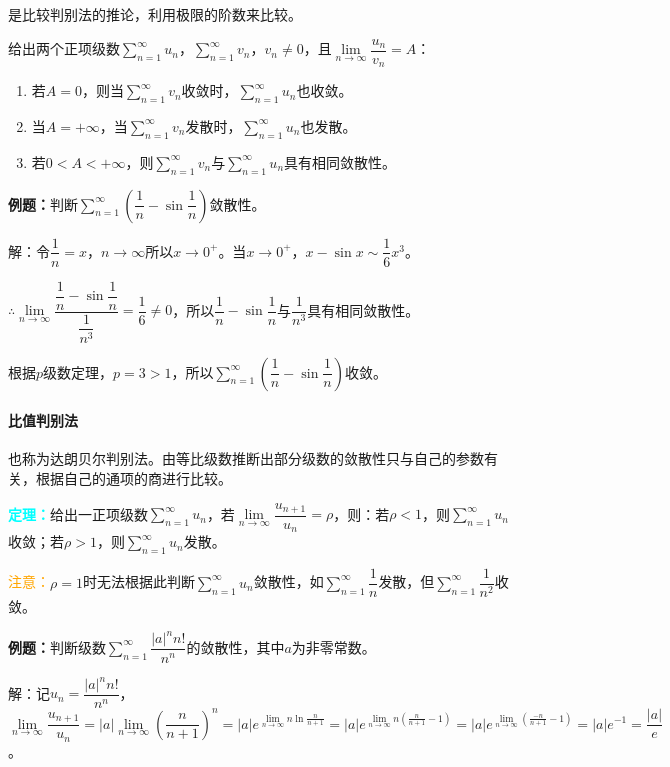\documentclass[UTF8, 12pt]{ctexart}
\begin{document}
是比较判别法的推论，利用极限的阶数来比较。

给出两个正项级数$\sum\limits_{n=1}^\infty u_n$，$\sum\limits_{n=1}^\infty v_n$，$v_n\neq0$，且$\lim\limits_{n\to\infty}\dfrac{u_n}{v_n}=A$：

\begin{enumerate}
    \item 若$A=0$，则当$\sum\limits_{n=1}^\infty v_n$收敛时，$\sum\limits_{n=1}^\infty u_n$也收敛。
    \item 当$A=+\infty$，当$\sum\limits_{n=1}^\infty v_n$发散时，$\sum\limits_{n=1}^\infty u_n$也发散。
    \item 若$0<A<+\infty$，则$\sum\limits_{n=1}^\infty v_n$与$\sum\limits_{n=1}^\infty u_n$具有相同敛散性。
\end{enumerate}

\textbf{例题：}判断$\sum\limits_{n=1}^\infty\left(\dfrac{1}{n}-\sin\dfrac{1}{n}\right)$敛散性。

解：令$\dfrac{1}{n}=x$，$n\to\infty$所以$x\to0^+$。当$x\to0^+$，$x-\sin x\sim\dfrac{1}{6}x^3$。

$\therefore\lim\limits_{n\to\infty}\dfrac{\dfrac{1}{n}-\sin\dfrac{1}{n}}{\dfrac{1}{n^3}}=\dfrac{1}{6}\neq0$，所以$\dfrac{1}{n}-\sin\dfrac{1}{n}$与$\dfrac{1}{n^3}$具有相同敛散性。

根据$p$级数定理，$p=3>1$，所以$\sum\limits_{n=1}^\infty\left(\dfrac{1}{n}-\sin\dfrac{1}{n}\right)$收敛。

\paragraph{比值判别法} \leavevmode \medskip

也称为达朗贝尔判别法。由等比级数推断出部分级数的敛散性只与自己的参数有关，根据自己的通项的商进行比较。

\textcolor{aqua}{\textbf{定理：}}给出一正项级数$\sum\limits_{n=1}^\infty u_n$，若$\lim\limits_{n\to\infty}\dfrac{u_{n+1}}{u_n}=\rho$，则：若$\rho<1$，则$\sum\limits_{n=1}^\infty u_n$收敛；若$\rho>1$，则$\sum\limits_{n=1}^\infty u_n$发散。

\textcolor{orange}{注意：}$\rho=1$时无法根据此判断$\sum\limits_{n=1}^\infty u_n$敛散性，如$\sum\limits_{n=1}^\infty\dfrac{1}{n}$发散，但$\sum\limits_{n=1}^\infty\dfrac{1}{n^2}$收敛。

\textbf{例题：}判断级数$\sum\limits_{n=1}^\infty\dfrac{\vert a\vert^nn!}{n^n}$的敛散性，其中$a$为非零常数。

解：记$u_n=\dfrac{\vert a\vert^nn!}{n^n}$，$\lim\limits_{n\to\infty}\dfrac{u_{n+1}}{u_n}=\vert a\vert\lim\limits_{n\to\infty}\left(\dfrac{n}{n+1}\right)^n=\vert a\vert e^{\lim\limits_{n\to\infty}n\ln\frac{n}{n+1}}=\vert a\vert e^{\lim\limits_{n\to\infty}n(\frac{n}{n+1}-1)}=\vert a\vert e^{\lim\limits_{n\to\infty}(\frac{-n}{n+1}-1)}=\vert a\vert e^{-1}=\dfrac{\vert a\vert}{e}$。
\end{document}
